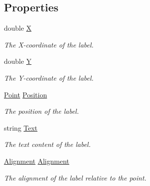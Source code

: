 \subsection*{Properties}
\begin{DoxyCompactItemize}
\item 
double \mbox{\hyperlink{class_s_g_l_1_1_label_adfba11f4ead1d6dd29785a7530acfca0}{X}}
\begin{DoxyCompactList}\small\item\em The X-\/coordinate of the label. \end{DoxyCompactList}\item 
double \mbox{\hyperlink{class_s_g_l_1_1_label_a7c8067fe0098721a4a9cb6bd187e005d}{Y}}
\begin{DoxyCompactList}\small\item\em The Y-\/coordinate of the label. \end{DoxyCompactList}\item 
\mbox{\hyperlink{struct_s_g_l_1_1_point}{Point}} \mbox{\hyperlink{class_s_g_l_1_1_label_a31dbcad567e6ef89d49f02eb55312308}{Position}}
\begin{DoxyCompactList}\small\item\em The position of the label. \end{DoxyCompactList}\item 
string \mbox{\hyperlink{class_s_g_l_1_1_label_abc39b1a43ac82e057d716f3d2bc6056a}{Text}}
\begin{DoxyCompactList}\small\item\em The text content of the label. \end{DoxyCompactList}\item 
\mbox{\hyperlink{namespace_s_g_l_aa8de446c655c151ef21cfe27b24da87c}{Alignment}} \mbox{\hyperlink{class_s_g_l_1_1_label_a00910f48f4a61d787308b77341ba9bcc}{Alignment}}
\begin{DoxyCompactList}\small\item\em The alignment of the label relative to the point. \end{DoxyCompactList}\end{DoxyCompactItemize}


